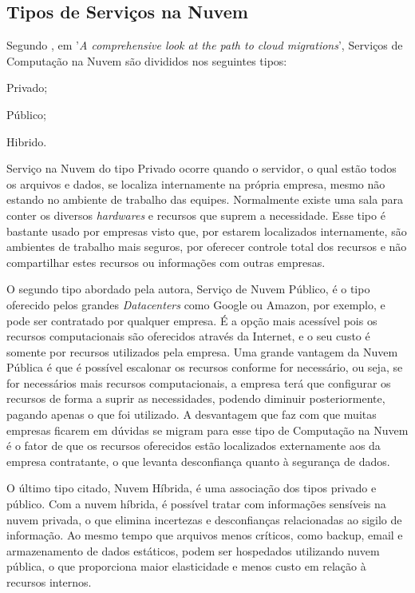 \subsection{Tipos de Serviços na Nuvem}
\label{s.cloudservices}

Segundo , em '{\em A comprehensive look at the path to cloud migrations}', Serviços de Computação na Nuvem são divididos nos seguintes tipos:

\begin{alineas}
  \item Privado;
  \item Público;
  \item Hibrido.
\end{alineas}

Serviço na Nuvem do tipo Privado ocorre quando o servidor, o qual estão todos os arquivos e dados, se localiza internamente na própria empresa, mesmo não estando no ambiente de trabalho das equipes. Normalmente existe uma sala para conter os diversos {\em hardwares} e recursos que suprem a necessidade. Esse tipo é bastante usado por empresas visto que, por estarem localizados internamente, são ambientes de trabalho mais seguros, por oferecer controle total dos recursos e não compartilhar estes recursos ou informações com outras empresas.

O segundo tipo abordado pela autora, Serviço de Nuvem Público, é o tipo oferecido pelos grandes {\em Datacenters} como Google ou Amazon, por exemplo, e pode ser contratado por qualquer empresa. É a opção mais acessível pois os recursos computacionais são oferecidos através da Internet, e o seu custo é somente por recursos utilizados pela empresa. Uma grande vantagem da Nuvem Pública é que é possível escalonar os recursos conforme for necessário, ou seja, se for necessários mais recursos computacionais, a empresa terá que configurar os recursos de forma a suprir as necessidades, podendo diminuir posteriormente, pagando apenas o que foi utilizado. A desvantagem que faz com que muitas empresas ficarem em dúvidas se migram para esse tipo de Computação na Nuvem é o fator de que os recursos oferecidos estão localizados externamente aos da empresa contratante, o que levanta desconfiança quanto à segurança de dados.

O último tipo citado, Nuvem Híbrida, é uma associação dos tipos privado e público. Com a nuvem híbrida, é possível tratar com informações sensíveis na nuvem privada, o que elimina incertezas e desconfianças relacionadas ao sigilo de informação. Ao mesmo tempo que arquivos menos críticos, como backup, email e armazenamento de dados estáticos, podem ser hospedados utilizando nuvem pública, o que proporciona maior elasticidade e menos custo em relação à recursos internos.

